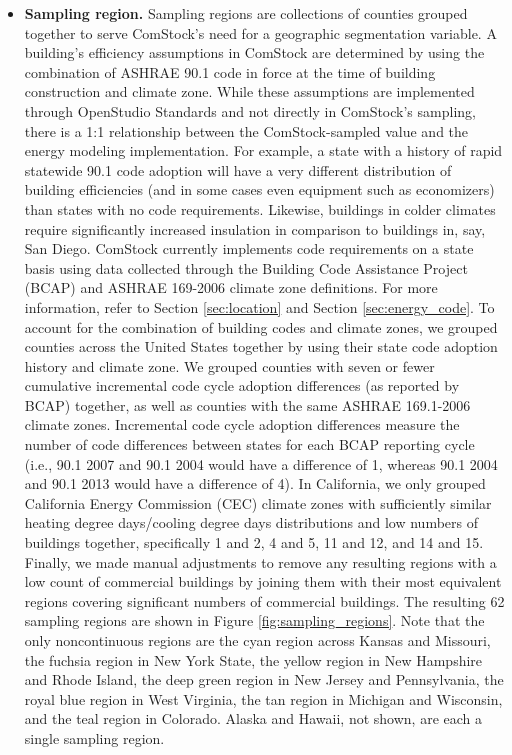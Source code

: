 \begin{itemize}
  \item \textbf{Sampling region.} Sampling regions are collections of counties grouped together to serve ComStock’s need for a geographic segmentation variable. A building’s efficiency assumptions in ComStock are determined by using the combination of ASHRAE 90.1 code in force at the time of building construction and climate zone. While these assumptions are implemented through OpenStudio Standards and not directly in ComStock's sampling, there is a 1:1 relationship between the ComStock-sampled value and the energy modeling implementation. For example, a state with a history of rapid statewide 90.1 code adoption will have a very different distribution of building efficiencies (and in some cases even equipment such as economizers) than states with no code requirements. Likewise, buildings in colder climates require significantly increased insulation in comparison to buildings in, say, San Diego. ComStock currently implements code requirements on a state basis using data collected through the Building Code Assistance Project (BCAP) and ASHRAE 169-2006 climate zone definitions. For more information, refer to Section \ref{sec:location} and Section \ref{sec:energy_code}. To account for the combination of building codes and climate zones, we grouped counties across the United States together by using their state code adoption history and climate zone. We grouped counties with seven or fewer cumulative incremental code cycle adoption differences (as reported by BCAP) together, as well as counties with the same ASHRAE 169.1-2006 climate zones. Incremental code cycle adoption differences measure the number of code differences between states for each BCAP reporting cycle (i.e., 90.1 2007 and 90.1 2004 would have a difference of 1, whereas 90.1 2004 and 90.1 2013 would have a difference of 4). In California, we only grouped California Energy Commission (CEC) climate zones with sufficiently similar heating degree days/cooling degree days distributions and low numbers of buildings together, specifically 1 and 2, 4 and 5, 11 and 12, and 14 and 15. Finally, we made manual adjustments to remove any resulting regions with a low count of commercial buildings by joining them with their most equivalent regions covering significant numbers of commercial buildings. The resulting 62 sampling regions are shown in Figure \ref{fig:sampling_regions}. Note that the only noncontinuous regions are the cyan region across Kansas and Missouri, the fuchsia region in New York State, the yellow region in New Hampshire and Rhode Island, the deep green region in New Jersey and Pennsylvania, the royal blue region in West Virginia, the tan region in Michigan and Wisconsin, and the teal region in Colorado. Alaska and Hawaii, not shown, are each a single sampling region.
\end{itemize}

